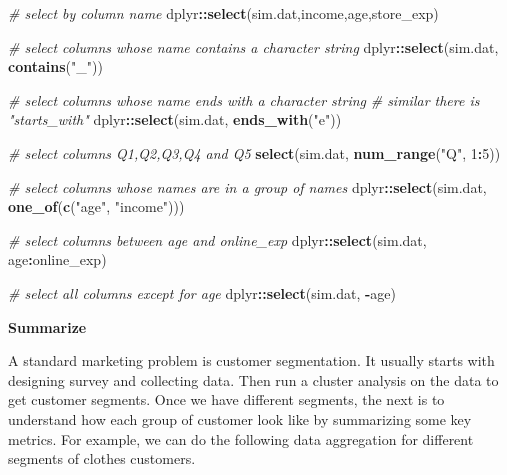 \documentclass[12pt,]{krantz}
\newenvironment{Shaded}{\begin{snugshade}}{\end{snugshade}}
\newcommand{\KeywordTok}[1]{\textcolor[rgb]{0.13,0.29,0.53}{\textbf{#1}}}
\newcommand{\DecValTok}[1]{\textcolor[rgb]{0.00,0.00,0.81}{#1}}
\newcommand{\StringTok}[1]{\textcolor[rgb]{0.31,0.60,0.02}{#1}}
\newcommand{\CommentTok}[1]{\textcolor[rgb]{0.56,0.35,0.01}{\textit{#1}}}
\newcommand{\OperatorTok}[1]{\textcolor[rgb]{0.81,0.36,0.00}{\textbf{#1}}}
\newcommand{\NormalTok}[1]{#1}
\theoremstyle{definition}
\theoremstyle{definition}
\theoremstyle{definition}
\theoremstyle{remark}
\begin{document}
\begin{Shaded}
\begin{Highlighting}[]
\CommentTok{# select by column name}
\NormalTok{dplyr}\OperatorTok{::}\KeywordTok{select}\NormalTok{(sim.dat,income,age,store_exp)}

\CommentTok{# select columns whose name contains a character string}
\NormalTok{dplyr}\OperatorTok{::}\KeywordTok{select}\NormalTok{(sim.dat, }\KeywordTok{contains}\NormalTok{(}\StringTok{"_"}\NormalTok{))}

\CommentTok{# select columns whose name ends with a character string}
\CommentTok{# similar there is "starts_with"}
\NormalTok{dplyr}\OperatorTok{::}\KeywordTok{select}\NormalTok{(sim.dat, }\KeywordTok{ends_with}\NormalTok{(}\StringTok{"e"}\NormalTok{))}

\CommentTok{# select columns Q1,Q2,Q3,Q4 and Q5}
\KeywordTok{select}\NormalTok{(sim.dat, }\KeywordTok{num_range}\NormalTok{(}\StringTok{"Q"}\NormalTok{, }\DecValTok{1}\OperatorTok{:}\DecValTok{5}\NormalTok{)) }

\CommentTok{# select columns whose names are in a group of names}
\NormalTok{dplyr}\OperatorTok{::}\KeywordTok{select}\NormalTok{(sim.dat, }\KeywordTok{one_of}\NormalTok{(}\KeywordTok{c}\NormalTok{(}\StringTok{"age"}\NormalTok{, }\StringTok{"income"}\NormalTok{)))}

\CommentTok{# select columns between age and online_exp}
\NormalTok{dplyr}\OperatorTok{::}\KeywordTok{select}\NormalTok{(sim.dat, age}\OperatorTok{:}\NormalTok{online_exp)}

\CommentTok{# select all columns except for age}
\NormalTok{dplyr}\OperatorTok{::}\KeywordTok{select}\NormalTok{(sim.dat, }\OperatorTok{-}\NormalTok{age)}
\end{Highlighting}
\end{Shaded}

\textbf{Summarize}

A standard marketing problem is customer segmentation. It usually starts
with designing survey and collecting data. Then run a cluster analysis
on the data to get customer segments. Once we have different segments,
the next is to understand how each group of customer look like by
summarizing some key metrics. For example, we can do the following data
aggregation for different segments of clothes customers.
\end{document}
